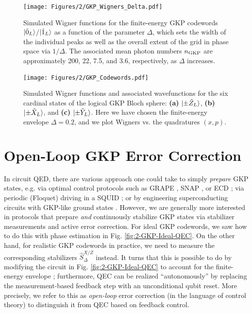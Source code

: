 \begin{figure}[h]
    \centering
    \texttt{[image: Figures/2/GKP\_Wigners\_Delta.pdf]}
    \caption{Simulated Wigner functions for the finite-energy GKP codewords $\lvert\tilde{0}_L\rangle$/$\lvert\tilde{1}_L\rangle$ as a function of the parameter $\Delta$, which sets the width of the individual peaks as well as the overall extent of the grid in phase space via $1/\Delta$. The associated mean photon numbers $n_{\rm GKP}$ are approximately 200, 22, 7.5, and 3.6, respectively, as $\Delta$ increases.}
    \label{fig:2_GKP_Wigners_Delta}
\end{figure}

\begin{figure}
    \centering
    \texttt{[image: Figures/2/GKP\_Codewords.pdf]}
    \caption{Simulated Wigner functions and associated wavefunctions for the six cardinal states of the logical GKP Bloch sphere: \textbf{(a)} $\lvert\pm \tilde{Z}_L\rangle$, \textbf{(b)} $\lvert\pm \tilde{X}_L\rangle$, and \textbf{(c)} $\lvert\pm \tilde{Y}_L\rangle$. Here we have chosen the finite-energy envelope $\Delta = 0.2$, and we plot Wigners vs. the quadratures $(x, p)$.}
    \label{fig:2_GKP_Codewords}
\end{figure}
\clearpage

\section{Open-Loop GKP Error Correction \label{sec:2_OpenLoopGKPQEC}}

In circuit QED, there are various approach one could take to simply \textit{prepare} GKP states, e.g. via optimal control protocols such as GRAPE \cite{khaneja2005grape, reinhold2019thesis}, SNAP \cite{krastanov2015-SNAP, heeres2015-SNAP, fosel2020-SNAP}, or ECD \cite{eickbusch2022fast}; via periodic (Floquet) driving in a SQUID \cite{gkp-periodic-drive2024}; or by engineering superconducting circuits with GKP-like ground states \cite{rymarz2021hardwaregkp}. However, we are generally more interested in protocols that prepare \textit{and} continuously stabilize GKP states via stabilizer measurements and active error correction. For ideal GKP codewords, we saw how to do this with phase estimation in Fig. \ref{fig:2-GKP-Ideal-QEC}. On the other hand, for realistic GKP codewords in practice, we need to measure the corresponding stabilizers $\hat{S}_\Delta^{X/Z}$ instead. It turns that this is possible to do by modifying the circuit in Fig. \ref{fig:2-GKP-Ideal-QEC} to account for the finite-energy envelope \cite{fluhmann2019gkp-expt, campagne2020gkp-expt, royer2020gkp, deneeve2022gkp-expt}; furthermore, QEC can be realized ``autonomously'' by replacing the measurement-based feedback step with an unconditional qubit reset. More precisely, we refer to this as \textit{open-loop} error correction (in the language of control theory) to distinguish it from QEC based on feedback control.

